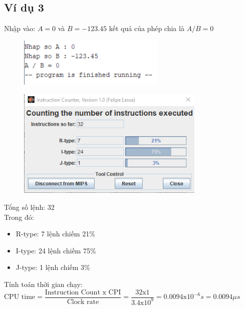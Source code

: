 \documentclass[a4paper]{article}
\begin{document}
\subsection{Ví dụ 3}
Nhập vào: $A = 0$ và $B = -123.45$ kết quả của phép chia là $A / B = 0$
\begin{center}
	\begin{figure}[h!]
		\begin{center}
			\includegraphics[width=7cm]{Images/8.png}
		\end{center}
	\end{figure}
\end{center}
\begin{center}
	\begin{figure}[h!]
		\begin{center}
			\includegraphics[width=9cm]{Images/9.png}
		\end{center}
	\end{figure}
\end{center}
Tổng số lệnh: 32\\
Trong đó:
\begin{itemize}
	\item R-type: 7 lệnh chiếm 21\%
	\item I-type: 24 lệnh chiếm 75\%
	\item J-type: 1 lệnh chiếm 3\%
\end{itemize}
Tính toán thời gian chạy:\\
$\text{CPU time} = \dfrac{\text{Instruction Count x CPI}}{\text{Clock rate}} = \dfrac{32\text{x}1}{3.4\text{x}10^9} = 0.0094 \text{x}10^{-6} s = 0.0094 \mu s$
\end{document}
